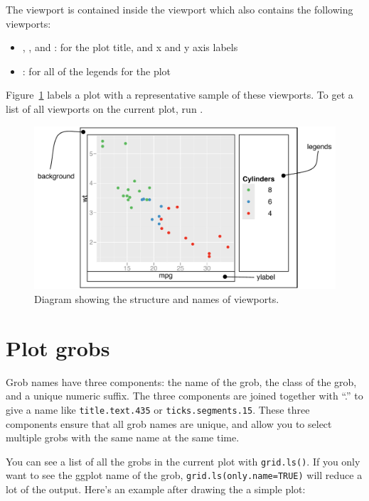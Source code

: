 The  viewport is contained inside the  viewport which also contains the following viewports:

\begin{itemize}
  \item {}, , and : for the plot title, and x and y axis labels
  \item {}: for all of the legends for the plot
\end{itemize}

\noindent Figure~\ref{fig:viewports} labels a plot with a representative sample of these viewports.  To get a list of all viewports on the current plot, run .

\begin{figure}[htbp]
  \centering
    \includegraphics[width=\textwidth]{grid-viewports.pdf}
  \caption{Diagram showing the structure and names of viewports.}
  \label{fig:viewports}
\end{figure}

\section{Plot grobs}
\label{sec:plot-grobs}

Grob names have three components: the name of the grob, the class of the grob, and a unique numeric suffix.  The three components are joined together with ``.'' to give a name like {\tt title.text.435} or {\tt ticks.segments.15}.  These three components ensure that all grob names are unique, and allow you to select multiple grobs with the same name at the same time.

You can see a list of all the grobs in the current plot with {\tt grid.ls()}.  If you only want to see the ggplot name of the grob, {\tt grid.ls(only.name=TRUE)} will reduce a lot of the output.  Here's an example after drawing the a simple plot:

